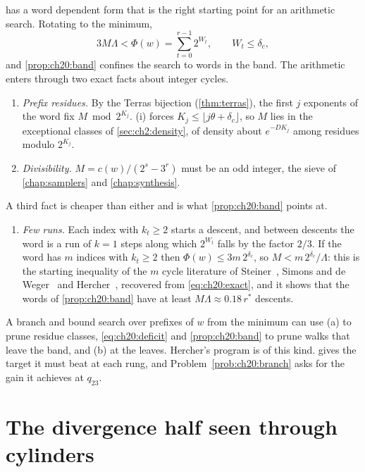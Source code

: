  has a word dependent form that is the right starting point for an arithmetic search. Rotating to the minimum,
\begin{equation}\label{eq:ch20:deficit}
3M\Lambda<\Phi(w)=\sum_{t=0}^{r-1}2^{W_t},\qquad W_t\le\delta_c ,
\end{equation}
and \cref{prop:ch20:band} confines the search to words in the band. The arithmetic enters through two exact facts about integer cycles.
\begin{enumerate}[label=(\alph*)]
\item \textit{Prefix residues.} By the Terras bijection (\cref{thm:terras}), the first $j$ exponents of the word fix $M\bmod2^{K_j}$. (i) forces $K_j\le\lfloor j\theta+\delta_c\rfloor$, so $M$ lies in the exceptional classes of \cref{sec:ch2:density}, of density about $e^{-DK_j}$ among residues modulo $2^{K_j}$.
\item \textit{Divisibility.} $M=c(w)/(2^s-3^r)$ must be an odd integer, the sieve of \cref{chap:samplers} and \cref{chap:synthesis}.
\end{enumerate}
A third fact is cheaper than either and is what \cref{prop:ch20:band} points at.
\begin{enumerate}[label=(\alph*),resume]
\item \textit{Few runs.} Each index with $k_t\ge2$ starts a descent, and between descents the word is a run of $k=1$ steps along which $2^{W_t}$ falls by the factor $2/3$. If the word has $m$ indices with $k_t\ge2$ then $\Phi(w)\le3m\,2^{\delta_c}$, so $M<m\,2^{\delta_c}/\Lambda$: this is the starting inequality of the $m$ cycle literature of Steiner~\cite{steiner1977}, Simons and de Weger~\cite{simons2005} and Hercher~\cite{hercher2023}, recovered from \eqref{eq:ch20:exact}, and it shows that the words of \cref{prop:ch20:band} have at least $M\Lambda\approx0.18\,r^\ast$ descents.
\end{enumerate}
A branch and bound search over prefixes of $w$ from the minimum can use (a) to prune residue classes, \eqref{eq:ch20:deficit} and \cref{prop:ch20:band} to prune walks that leave the band, and (b) at the leaves. Hercher's program is of this kind.  gives the target it must beat at each rung, and Problem~\ref{prob:ch20:branch} asks for the gain it achieves at $q_{23}$.

\section{The divergence half seen through cylinders}\label{sec:ch20:div}

